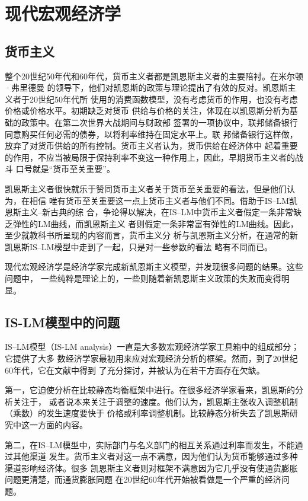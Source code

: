 \section{现代宏观经济学}

\subsection{货币主义}

整个20世纪50年代和60年代，货币主义者都是凯恩斯主义者的主要陪衬。在米尔顿·弗里德曼
的领导下，他们对凯恩斯的政策与理论提出了有效的反对。凯恩斯主义者于20世纪50年代所
使用的消费函数模型，没有考虑货币的作用，也没有考虑价格或价格水平。初期缺乏对货币
供给与价格的关注，体现在以凯恩斯分析为基础的政策中。在第二次世界大战期间与财政部
签署的一项协议中，联邦储备银行同意购买任何必需的债券，以将利率维持在固定水平上。联
邦储备银行这样做，放弃了对货币供给的所有控制。货币主义者认为，货币供给在经济体中
起着重要的作用，不应当被局限于保持利率不变这一种作用上，因此，早期货币主义者的战斗
口号就是“货币至关重要”。

凯恩斯主义者很快就乐于赞同货币主义者关于货币至关重要的看法，但是他们认为，在相信
唯有货币至关重要这一点上货币主义者与他们不同。借助于IS--LM凯恩斯主义--新古典的综
合，争论得以解决，在IS--LM中货币主义者假定一条非常缺乏弹性的LM曲线，而凯恩斯主义
者则假定一条非常富有弹性的LM曲线。因此，至少就教科书所呈现的内容而言，货币主义分
析与凯恩斯主义分析，在通常的新凯恩斯IS--LM模型中走到了一起，只是对一些参数的看法
略有不同而已。

现代宏观经济学是经济学家完成新凯恩斯主义模型，并发现很多问题的结果。这些问题中，
一些纯粹是理论上的，一些则随着新凯恩斯主义政策的失败而变得明显。

\subsection{IS-LM模型中的问题}

IS--LM模型（IS-LM analysis）一直是大多数宏观经济学家工具箱中的组成部分；它提供了大多
数经济学家最初用来应对宏观经济分析的框架。然而，到了20世纪60年代，它在文献中得到
了充分探讨，并被认为在若干方面存在欠缺。

第一，它迫使分析在比较静态均衡框架中进行。在很多经济学家看来，凯恩斯的分析关注于，
或者说本来关注于调整的速度。他们认为，凯恩斯主张收入调整机制（乘数）的发生速度要快于
价格或利率调整机制。比较静态分析失去了凯恩斯研究中这一方面的内容。

第二，在IS--LM模型中，实际部门与名义部门的相互关系通过利率而发生，不能通过其他渠道
发生。货币主义者对这一点不满意，因为他们认为货币能够通过多种渠道影响经济体。很多
凯恩斯主义者则对框架不满意因为它几乎没有使通货膨胀问题更清楚，而通货膨胀同题
在20世纪60年代开始被看做是一个严重的经济问题。

